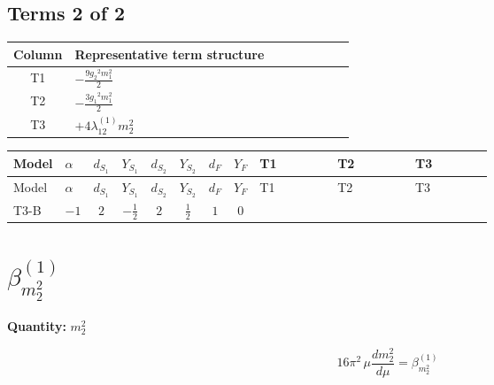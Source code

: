 \documentclass[8pt]{article}
\begin{document}
\begin{landscape}
\subsection*{Terms 2 of 2}
\begin{center}
\begin{tabular}{@{}c >{\raggedright\arraybackslash}p{0.82\linewidth}@{}}
\toprule
Column & Representative term structure \\
\midrule
T1 & \(\displaystyle -\frac{9 {g_2}^2 {m_1^2}}{2}\) \\
\midrule
T2 & \(\displaystyle -\frac{3 {g_1}^2 {m_1^2}}{2}\) \\
\midrule
T3 & \(\displaystyle +4 {\lambda_{12}^{(1)}} {m_2^2}\) \\
\midrule
\bottomrule
\end{tabular}
\end{center}
\smallskip
\tiny
\begin{longtable}{@{}llcccccc >{\raggedright\arraybackslash}p{0.21\linewidth} >{\raggedright\arraybackslash}p{0.21\linewidth} >{\raggedright\arraybackslash}p{0.21\linewidth}@{}}
\toprule
Model & $\alpha$ & $d_{S_1}$ & $Y_{S_1}$ & $d_{S_2}$ & $Y_{S_2}$ & $d_F$ & $Y_F$ & T1 & T2 & T3 \\
\midrule
\endfirsthead
\toprule
Model & $\alpha$ & $d_{S_1}$ & $Y_{S_1}$ & $d_{S_2}$ & $Y_{S_2}$ & $d_F$ & $Y_F$ & T1 & T2 & T3 \\
\midrule
\endhead
T3-B & $-1$ & $2$ & $-\frac{1}{2}$ & $2$ & $\frac{1}{2}$ & $1$ & $0$ & \scriptsize\adjustbox{max width=\linewidth}{$\begin{gathered} -\frac{9 {g_2}^2 {m_1^2}}{2}\end{gathered}$} & \scriptsize\adjustbox{max width=\linewidth}{$\begin{gathered} -\frac{3 {g_1}^2 {m_1^2}}{2}\end{gathered}$} & \scriptsize\adjustbox{max width=\linewidth}{$\begin{gathered} +4 {\lambda_{12}^{(1)}} {m_2^2}\end{gathered}$} \\
\midrule
\bottomrule
\end{longtable}
\clearpage
\section*{$\beta_{m_2^2}^{(1)}$}
\noindent\textbf{Quantity: }$m_2^2$\par\smallskip
\[16\pi^2\,\mu\frac{d m_2^2}{d\mu}=\beta_{m_2^2}^{(1)}\]

\end{landscape}
\end{document}
